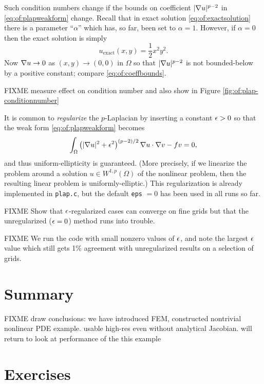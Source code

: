 Such condition numbers change if the bounds on coefficient $|\nabla u|^{p-2}$ in  \eqref{eq:of:plapweakform} change.  Recall that in exact solution \eqref{eq:of:exactsolution} there is a parameter ``$\alpha$'' which has, so far, been set to $\alpha = 1$.  However, if $\alpha=0$ then the exact solution is simply
\begin{equation}
    u_{\text{exact}}(x,y) = \frac{1}{2} x^2 y^2. \label{eq:of:exactsolutionbad}
\end{equation}
Now $\nabla u \to 0$ as $(x,y)\to(0,0)$ in $\Omega$ so that $|\nabla u|^{p-2}$ is not bounded-below by a positive constant; compare \eqref{eq:of:coeffbounds}.  

FIXME measure effect on condition number and also show in Figure \ref{fig:of:plap-conditionnumber}

It is common to \emph{regularize} the $p$-Laplacian by inserting a constant $\epsilon>0$ so that the weak form \eqref{eq:of:plapweakform} becomes
\begin{equation}
\int_\Omega \left(|\nabla u|^2+\epsilon^2\right)^{(p-2)/2} \nabla u \cdot \nabla v - f v = 0, \label{eq:of:plapweakformreg}
\end{equation}
and thus uniform-ellipticity is guaranteed.  (More precisely, if we linearize the problem around a solution $u\in W^{1,p}(\Omega)$ of the nonlinear problem, then the resulting linear problem is uniformly-elliptic.)  This regularization is already implemented in \texttt{plap.c}, but the default \texttt{eps} $=0$ has been used in all runs so far.

FIXME Show that $\epsilon$-regularized cases can converge on fine grids but that the unregularized ($\epsilon=0$) method runs into trouble.

FIXME We run the code with small nonzero values of $\epsilon$, and note the largest $\epsilon$ value which still gets 1\% agreement with unregularized results on a selection of grids.


\section{Summary}

FIXME draw conclusions: we have introduced FEM, constructed nontrivial nonlinear PDE example.  usable high-res even without analytical Jacobian.  will return to look at performance of the this example


\section{Exercises}

